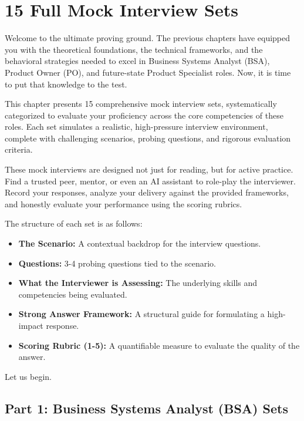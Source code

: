 \documentclass[
  11pt,
  openany,
  oneside]{book}
\providecommand{\tightlist}{%
  \setlength{\itemsep}{0pt}\setlength{\parskip}{0pt}}
\begin{document}
\chapter{15 Full Mock Interview Sets}\label{full-mock-interview-sets}

Welcome to the ultimate proving ground. The previous chapters have
equipped you with the theoretical foundations, the technical frameworks,
and the behavioral strategies needed to excel in Business Systems
Analyst (BSA), Product Owner (PO), and future-state Product Specialist
roles. Now, it is time to put that knowledge to the test.

This chapter presents 15 comprehensive mock interview sets,
systematically categorized to evaluate your proficiency across the core
competencies of these roles. Each set simulates a realistic,
high-pressure interview environment, complete with challenging
scenarios, probing questions, and rigorous evaluation criteria.

These mock interviews are designed not just for reading, but for active
practice. Find a trusted peer, mentor, or even an AI assistant to
role-play the interviewer. Record your responses, analyze your delivery
against the provided frameworks, and honestly evaluate your performance
using the scoring rubrics.

The structure of each set is as follows:

\begin{itemize}
\tightlist
\item
  \textbf{The Scenario:} A contextual backdrop for the interview
  questions.
\item
  \textbf{Questions:} 3-4 probing questions tied to the scenario.
\item
  \textbf{What the Interviewer is Assessing:} The underlying skills and
  competencies being evaluated.
\item
  \textbf{Strong Answer Framework:} A structural guide for formulating a
  high-impact response.
\item
  \textbf{Scoring Rubric (1-5):} A quantifiable measure to evaluate the
  quality of the answer.
\end{itemize}

Let us begin.

\bigskip

\section{Part 1: Business Systems Analyst (BSA)
Sets}\label{part-1-business-systems-analyst-bsa-sets}
\end{document}
